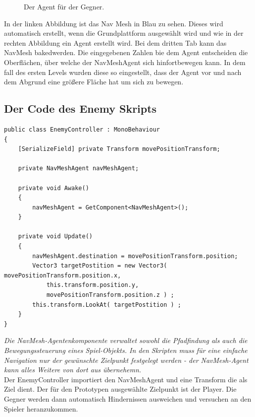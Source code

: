 \begin{figure}[h]
\begin{minipage}[b]{0.45\textwidth}
        \caption{Der Agent für der Gegner.}
        \label{fig:PE0SD022}
    \end{minipage}
\end{figure}

In der linken Abbildung ist das Nav Mesh in Blau zu sehen. Dieses wird automatisch erstellt, wenn die Grundplattform ausgewählt wird und wie in der rechten Abbildung ein Agent erstellt wird. Bei dem dritten Tab kann das NavMesh \glqq baked\grqq \space werden. Die eingegebenen Zahlen bie dem Agent entscheiden die Oberflächen, über welche der NavMeshAgent sich hinfortbewegen kann. In dem fall des ersten Levels wurden diese so eingestellt, dass der Agent vor und nach dem Abgrund eine größere Fläche hat um sich zu bewegen. 


\pagebreak
\subsection{Der Code des Enemy Skripts}
\begin{lstlisting}[language=CSharp,caption={EnemyController},label=code:enemyController]
public class EnemyController : MonoBehaviour
{
    [SerializeField] private Transform movePositionTransform;

    private NavMeshAgent navMeshAgent;

    private void Awake()
    {
        navMeshAgent = GetComponent<NavMeshAgent>();
    }
    
    private void Update()
    {
        navMeshAgent.destination = movePositionTransform.position;
        Vector3 targetPostition = new Vector3( movePositionTransform.position.x, 
            this.transform.position.y, 
            movePositionTransform.position.z ) ;
        this.transform.LookAt( targetPostition ) ;
    }
}
\end{lstlisting}

\emph{\glqq Die NavMesh-Agentenkomponente verwaltet sowohl die Pfadfindung als auch die Bewegungssteuerung eines Spiel-Objekts. In den Skripten muss für eine einfache Navigation nur der gewünschte Zielpunkt festgelegt werden - der NavMesh-Agent kann alles Weitere von dort aus übernehemn.\grqq}~\cite[Unity NavMesh Dokumentation]{unitydocNavmesh} \\

Der EnemyController importiert den NavMeshAgent und eine Transform die als Ziel dient. Der für den Prototypen ausgewählte Zielpunkt ist der Player. Die Gegner werden dann automatisch Hindernissen ausweichen und versuchen an den Spieler heranzukommen. 

